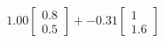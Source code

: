 \documentclass[preview]{standalone}
\begin{document}
\begin{align*}
1.00 \begin{bmatrix} 0.8 \\ 0.5 \end{bmatrix} + -0.31 \begin{bmatrix} 1 \\ 1.6 \end{bmatrix}
\end{align*}
\end{document}
